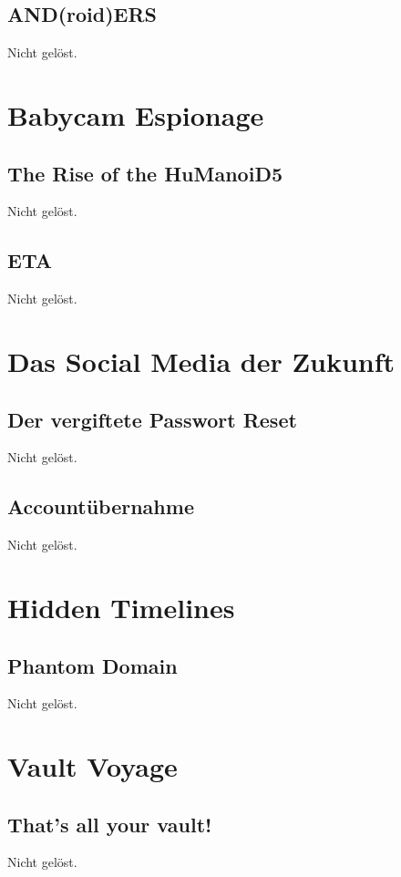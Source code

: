 \documentclass[12pt,a4paper,titlepage,oneside]{scrartcl}
\begin{document}
\subsection{AND(roid)ERS}
Nicht gelöst.


\section{Babycam Espionage}

\subsection{The Rise of the HuManoiD5}
Nicht gelöst.

\subsection{ETA}
Nicht gelöst.


\section{Das Social Media der Zukunft}

\subsection{Der vergiftete Passwort Reset}
Nicht gelöst.

\subsection{Accountübernahme}
Nicht gelöst.


\section{Hidden Timelines}

\subsection{Phantom Domain}
Nicht gelöst.


\section{Vault Voyage}

\subsection{That's all your vault!}
Nicht gelöst.
\end{document}
